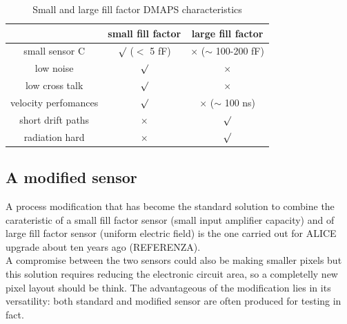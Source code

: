 \begin{table}
   \begin{center}
   \begin{tabular}{|c | c |c |}
   \hline
   & small fill factor & large fill factor\\
   \hline
   \hline
   small sensor C & $\surd$ ($<$ 5 fF) & $\times$ ($\sim$ 100-200 fF)\\
   low noise & $\surd$ & $\times$\\
   low cross talk & $\surd$ & $\times$ \\
   velocity perfomances & $\surd$ & $\times$ ($\sim$ 100 ns)\\
   short drift paths & $\times$ & $\surd$ \\
   radiation hard & $\times$ & $\surd$ \\
   \hline
   \end{tabular}
   \caption{Small and large fill factor DMAPS characteristics}
   \label{tab:DMAPS_large_small_fillfactor}
   \end{center}
\end{table}

\subsection{A modified sensor}
A process modification that has become the standard solution to combine the carateristic of a small fill factor sensor (small input amplifier capacity) and of large fill factor sensor (uniform electric field) is the one carried out for ALICE upgrade about ten years ago (REFERENZA).\\
A compromise between the two sensors could also be making smaller pixels but this solution requires reducing the electronic circuit area, so a completelly new pixel layout should be think. The advantageous of the modification lies in its versatility: both standard and modified sensor are often produced for testing in fact.\\

